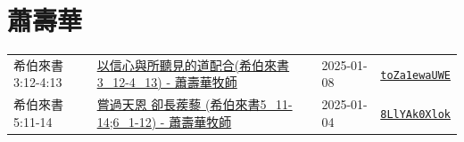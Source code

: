 \documentclass{book}
\begin{document}
\chapter{蕭壽華}\label{ch:preacher8}
\begin{multicols}{3}
\minitoc
\end{multicols}
{ \scriptsize


\begin{xltabular}{\textwidth}{|p{0.15\textwidth} p{0.6\textwidth}|p{0.07\textwidth} p{0.1\textwidth}|}
\hline
希伯來書 3:12-4:13 & \hyperref[sec:toZa1ewaUWE]{以信心與所聽見的道配合(希伯來書3\_12-4\_13) - 蕭壽華牧師} & 2025-01-08 & \href{https://youtube.com/watch?v=toZa1ewaUWE}{\texttt{toZa1ewaUWE}} \\
希伯來書 5:11-14 & \hyperref[sec:8LlYAk0Xlok]{嘗過天恩 卻長蒺藜 (希伯來書5\_11-14;6\_1-12) - 蕭壽華牧師} & 2025-01-04 & \href{https://youtube.com/watch?v=8LlYAk0Xlok}{\texttt{8LlYAk0Xlok}} \\
\hline
\end{xltabular}
}
\newpage
\end{document}
